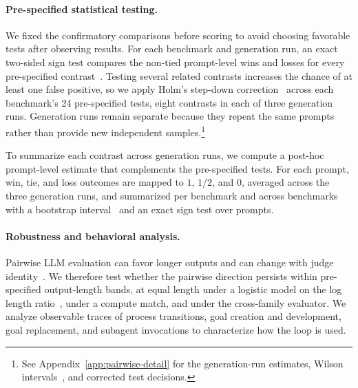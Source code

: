 \paragraph{Pre-specified statistical testing.}
We fixed the confirmatory comparisons before scoring to avoid choosing favorable tests after observing results.
For each benchmark and generation run, an exact two-sided sign test compares the non-tied prompt-level wins and losses for every pre-specified contrast~\citep{dixonmood1946}.
Testing several related contrasts increases the chance of at least one false positive, so we apply Holm's step-down correction~\citep{holm1979} across each benchmark's 24 pre-specified tests, eight contrasts in each of three generation runs.
Generation runs remain separate because they repeat the same prompts rather than provide new independent samples.\footnote{See Appendix~\ref{app:pairwise-detail} for the generation-run estimates, Wilson intervals~\citep{wilson1927}, and corrected test decisions.}

To summarize each contrast across generation runs, we compute a post-hoc prompt-level estimate that complements the pre-specified tests.
For each prompt, win, tie, and loss outcomes are mapped to $1$, $1/2$, and $0$, averaged across the three generation runs, and summarized per benchmark and across benchmarks with a bootstrap interval~\citep{efron1979bootstrap} and an exact sign test over prompts.

\paragraph{Robustness and behavioral analysis.}
Pairwise LLM evaluation can favor longer outputs and can change with judge identity~\citep{zheng2023judging,dubois2024length,saito2023verbosity,li2026preference,panickssery2024selfpreference}.
We therefore test whether the pairwise direction persists within pre-specified output-length bands, at equal length under a logistic model on the log length ratio~\citep{dubois2024length}, under a compute match, and under the cross-family evaluator.
We analyze observable traces of process transitions, goal creation and development, goal replacement, and subagent invocations to characterize how the loop is used.
